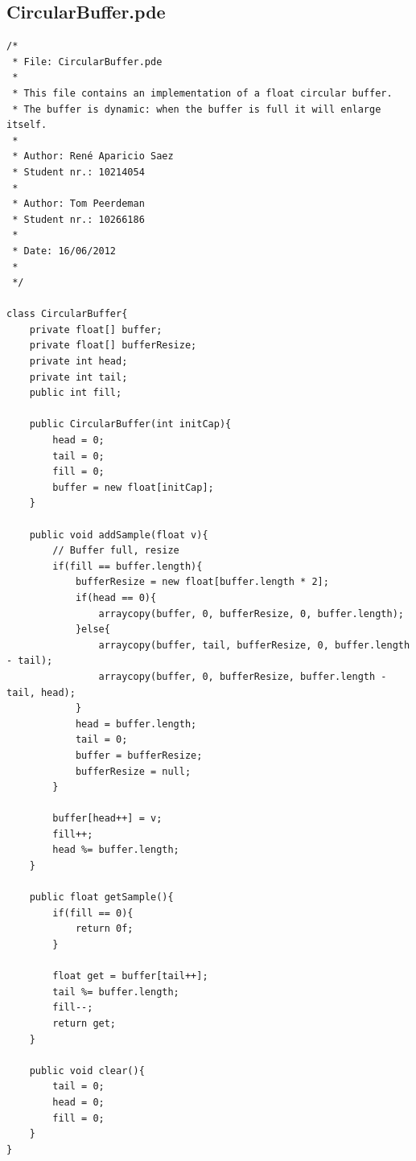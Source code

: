 \documentclass[a4paper]{article}
\begin{document}
\subsection{CircularBuffer.pde}
\begin{verbatim}
/*
 * File: CircularBuffer.pde
 *
 * This file contains an implementation of a float circular buffer.
 * The buffer is dynamic: when the buffer is full it will enlarge itself.
 *
 * Author: René Aparicio Saez
 * Student nr.: 10214054
 *
 * Author: Tom Peerdeman
 * Student nr.: 10266186
 *
 * Date: 16/06/2012
 *
 */

class CircularBuffer{
    private float[] buffer;
    private float[] bufferResize;
    private int head;
    private int tail;
    public int fill;
    
    public CircularBuffer(int initCap){
        head = 0;
        tail = 0;
        fill = 0;
        buffer = new float[initCap];
    }
    
    public void addSample(float v){
        // Buffer full, resize
        if(fill == buffer.length){
            bufferResize = new float[buffer.length * 2];
            if(head == 0){
                arraycopy(buffer, 0, bufferResize, 0, buffer.length);             
            }else{
                arraycopy(buffer, tail, bufferResize, 0, buffer.length - tail);
                arraycopy(buffer, 0, bufferResize, buffer.length - tail, head);
            }
            head = buffer.length;
            tail = 0;
            buffer = bufferResize;
            bufferResize = null;
        }
        
        buffer[head++] = v;
        fill++;
        head %= buffer.length;
    }
    
    public float getSample(){
        if(fill == 0){
            return 0f;
        } 

        float get = buffer[tail++];
        tail %= buffer.length;
        fill--;
        return get;
    }
    
    public void clear(){
        tail = 0;
        head = 0; 
        fill = 0;
    }
}
\end{verbatim}
\newpage
\end{document}
